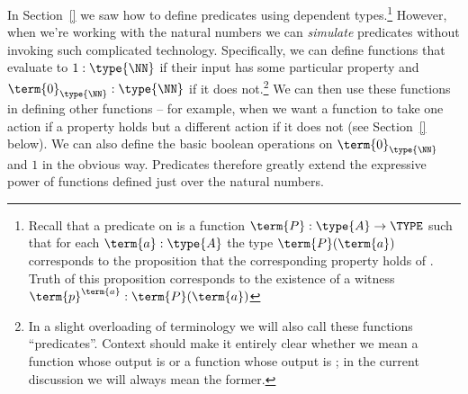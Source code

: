 In Section~\ref{} we saw how to define predicates using dependent types.\footnote{
Recall that a predicate on  is a function $\term{P}: \type{A} \to \TYPE$ such that for each $\term{a}:\type{A}$ the type $\term{P}(\term{a})$ corresponds to the proposition that the corresponding property holds of .  Truth of this proposition corresponds to the existence of a witness 
$\term{p}^{\term{a}}:\term{P}(\term{a})$
}
However, when we're working with the natural numbers we can \emph{simulate} predicates without invoking such complicated technology.
Specifically, we can define functions that evaluate to $1:\type{\NN}$ if their input has some particular property and $\term{0}_{\type{\NN}}:\type{\NN}$ if it does not.\footnote{
In a slight overloading of terminology we will also call these functions ``predicates''.  Context should make it entirely clear whether we mean a function whose output is \type{\NN} or a function whose output is \TYPE; in the current discussion we will always mean the former.
}  
We can then use these functions in defining other functions -- for example, when we want a function to take one action if a property holds but a different action if it does not (see Section~\ref{} below).  We can also define the basic boolean operations on $\term{0}_{\type{\NN}}$ and $1$ in the obvious way.  Predicates therefore greatly extend the expressive power of functions defined just over the natural numbers.  

